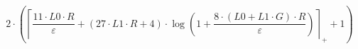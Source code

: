 \[2 \cdot \left(\left\lceil \frac{11 \cdot L0 \cdot R}{\varepsilon} + \left(27 \cdot L1 \cdot R + 4\right) \cdot \log\left(1 + \frac{8 \cdot \left(L0 + L1 \cdot G\right) \cdot R}{\varepsilon}\right) \right\rceil_{+} + 1\right)\]
